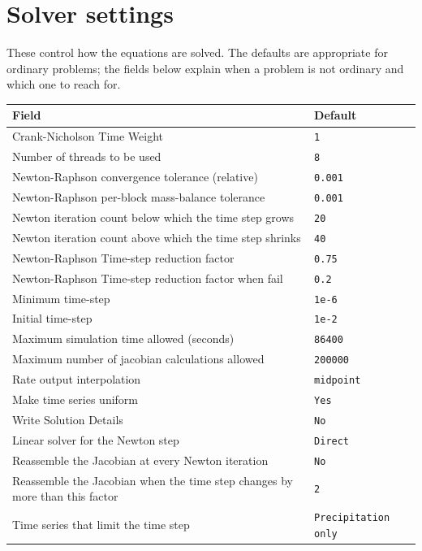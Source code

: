 \documentclass[11pt]{article}
\begin{document}
\section{Solver settings}
These control how the equations are solved. The defaults are appropriate for ordinary problems; the fields below explain when a problem is not ordinary and which one to reach for.
\begin{longtable}{@{}p{}p{}@{}}
\toprule \textrm{Field} & \textrm{Default} \\ \midrule \endhead
Crank-Nicholson Time Weight & \texttt{\small 1} \\
Number of threads to be used & \texttt{\small 8} \\
Newton-Raphson convergence tolerance (relative) & \texttt{\small 0.\allowbreak{}001} \\
Newton-Raphson per-block mass-balance tolerance & \texttt{\small 0.\allowbreak{}001} \\
Newton iteration count below which the time step grows & \texttt{\small 20} \\
Newton iteration count above which the time step shrinks & \texttt{\small 40} \\
Newton-Raphson Time-step reduction factor & \texttt{\small 0.\allowbreak{}75} \\
Newton-Raphson Time-step reduction factor when fail & \texttt{\small 0.\allowbreak{}2} \\
Minimum time-step & \texttt{\small 1e-6} \\
Initial time-step & \texttt{\small 1e-2} \\
Maximum simulation time allowed (seconds) & \texttt{\small 86400} \\
Maximum number of jacobian calculations allowed & \texttt{\small 200000} \\
Rate output interpolation & \texttt{\small midpoint} \\
Make time series uniform & \texttt{\small Yes} \\
Write Solution Details & \texttt{\small No} \\
Linear solver for the Newton step & \texttt{\small Direct} \\
Reassemble the Jacobian at every Newton iteration & \texttt{\small No} \\
Reassemble the Jacobian when the time step changes by more than this factor & \texttt{\small 2} \\
Time series that limit the time step & \texttt{\small Precipitation only} \\

\end{longtable}
\end{document}
